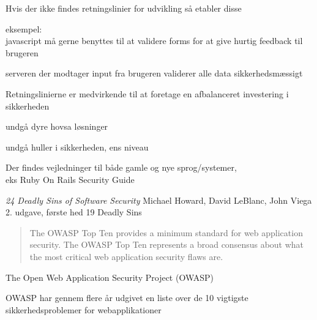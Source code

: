\documentclass[20pt,landscape,a4paper,footrule]{foils}
\begin{document}

\begin{list2}
\item Hvis der ikke findes retningslinier for udvikling så etabler disse
\item eksempel:\\
javascript må gerne benyttes til at validere forms for at give hurtig
feedback til brugeren
\item serveren der modtager input fra brugeren validerer alle data
  sikkerhedsmæssigt
\item Retningslinierne er medvirkende til at foretage
en afbalanceret investering i sikkerheden
\item undgå dyre hovsa løsninger
\item undgå huller i sikkerheden, ens niveau

\item Der findes vejledninger til både gamle og nye sprog/systemer, \\
eks Ruby On Rails Security Guide
\end{list2}





\begin{list1}
\item \emph{24 Deadly Sins of Software Security}
Michael Howard, David LeBlanc, John Viega 2. udgave, første hed 19 Deadly Sins
\end{list1}



\begin{quote}
The OWASP Top Ten provides a minimum standard for web application
security. The OWASP Top Ten represents a broad consensus about what
the most critical web application security flaws are.
\end{quote}

\begin{list1}
\item The Open Web Application Security Project (OWASP)
\item OWASP har gennem flere år udgivet en liste over de 10 vigtigste
  sikkerhedsproblemer for webapplikationer
\item {}
\end{list1}
\end{document}
